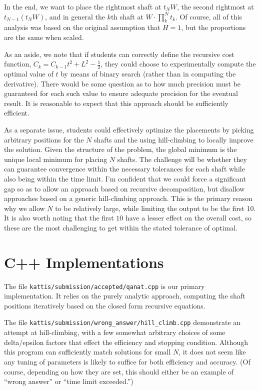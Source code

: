 \documentclass[12pt]{article}
\begin{document}
In the end, we want to place the rightmost shaft at $t_NW$, the second
rightmost at $t_{N-1}(t_NW)$, and in general the $k$th shaft at
$W \cdot \prod_k^N t_k$. Of course, all of this analysis was based on
the original assumption that $H=1$, but the proportions are the same
when scaled.
 

\bigskip
As an aside, we note that if students can correctly define the
recursive cost function, $C_k = C_{k-1}t^2 + L^2 - \frac{1}{2}$, they
could choose to experimentally compute the optimal value of $t$ by
means of binary search (rather than in computing the
derivative). There would be some question as to how much precision
must be guaranteed for each such value to ensure adequate precision
for the eventual result. It is reasonable to expect that this approach
should be sufficiently efficient.

\bigskip
As a separate issue, students could effectively optimize the
placements by picking arbitrary positions for the $N$ shafts and the
using hill-climbing to locally improve the solution. Given the
structure of the problem, the global minimum is the unique local
minimum for placing $N$ shafts. The challenge will be whether they can
guarantee convergence within the necessary tolerances for each shaft
while also being within the time limit. I'm confident that we could
force a significant gap so as to allow an approach based on recursive
decomposition, but disallow approaches based on a generic
hill-climbing approach. This is the primary reason why we allow $N$ to
be relatively large, while limiting the output to be the first 10.
%
It is also worth noting that the first $10$ have a lesser effect on
the overall cost, so these are the most challenging to get within the
stated tolerance of optimal.



\section*{C++ Implementations}

The file {\tt kattis/submission/accepted/qanat.cpp} is our primary
implementation. It relies on the purely analytic approach, computing
the shaft positions iteratively based on the closed form recursive
equations.

The file {\tt kattis/submission/wrong\_answer/hill\_climb.cpp}
demonstrate an attempt at hill-climbing, with a few somewhat arbitrary
choices of some delta/epsilon factors that effect the efficiency and stopping
condition. Although this program can sufficiently match solutions for
small $N$, it does not seem like any tuning of parameters is likely to
suffice for both efficiency and accuracy. (Of course, depending on how
they are set, this should either be an example of ``wrong answer'' or
``time limit exceeded.'')
\end{document}
